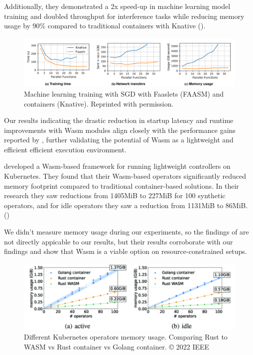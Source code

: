 \documentclass[
  table]{report}
\begin{document}
Additionally, they demonstrated a 2x speed-up in machine learning model
training and doubled throughput for interference tasks while reducing
memory usage by 90\% compared to traditional containers with Knative
().

\begin{figure}[H]
\centering
  \includegraphics{assets/3.8-faasm.png}
  \caption{Machine learning training with SGD with Faaslets (FAASM) and containers (Knative). Reprinted with permission.}
  \label{fig:wasm-faasm}
\end{figure}

Our results indicating the drastic reduction in startup latency and
runtime improvements with \ac{Wasm} modules align closely with the
performance gains reported by
\citet{shillakerFaasmLightweightIsolation2020a}, further validating the
potential of \ac{Wasm} as a lightweight and efficient efficient
execution environment.

\citet{sebrechtsAdaptingKubernetesControllers2022} developed a
\ac{Wasm}-based framework for running lightweight controllers on
Kubernetes. They found that their \ac{Wasm}-based operators
significantly reduced memory footprint compared to traditional
container-based solutions. In their research they saw reductions from
1405MiB to 227MiB for 100 synthetic operators, and for idle operators
they saw a reduction from 1131MiB to 86MiB. ()

We didn't measure memory usage during our experiments, so the findings
of \citet{sebrechtsAdaptingKubernetesControllers2022} are not directly
appicable to our results, but their results corroborate with our
findings and show that \ac{Wasm} is a viable option on
resource-constrained setups.

\begin{figure}[H]
\centering
  \includegraphics{assets/3.8-memoryusage-wasm.png}
  \caption{Different Kubernetes operators memory usage. Comparing Rust to WASM
vs Rust container vs Golang container. © 2022 IEEE}
  \label{fig:wasm-memory}
\end{figure}
\end{document}
